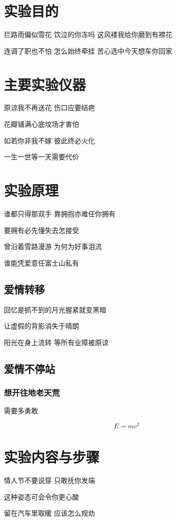 \documentclass[12pt,a4paper]{ctexart}
\begin{document}
\begin{tcolorbox}[
    colback=white, colframe=black,
    boxrule=0.5pt, sharp corners,
    left=0.5cm, right=0.5cm, top=0.5cm, bottom=0.5cm,
    before skip=0pt, after skip=0pt,
    breakable
]
\setlength{\parindent}{2em}
\setlength{\parskip}{0pt}

\section{实验目的}
拦路雨偏似雪花 饮泣的你冻吗 这风褛我给你磨到有襟花

连调了职也不怕 怎么始终牵挂 苦心选中今天想车你回家
\section{主要实验仪器}
原谅我不再送花 伤口应要结疤

花瓣铺满心底坟场才害怕

如若你非我不嫁 彼此终必火化

一生一世等一天需要代价

\section{实验原理}
谁都只得那双手 靠拥抱亦难任你拥有

要拥有必先懂失去怎接受

曾沿着雪路漫游 为何为好事泪流

谁能凭爱意任富士山私有

\subsection{爱情转移}
回忆是抓不到的月光握紧就变黑暗

让虚假的背影消失于晴朗

阳光在身上流转 等所有业障被原谅

\subsection{爱情不停站}
\subsubsection{想开往地老天荒}
需要多勇敢

\begin{equation}
    E= mc^2
\end{equation}
\section{实验内容与步骤}
情人节不要说穿 只敢抚你发端

这种姿态可会令你更心酸

留在汽车里取暖 应该怎么规劝


\end{tcolorbox}
\end{document}
